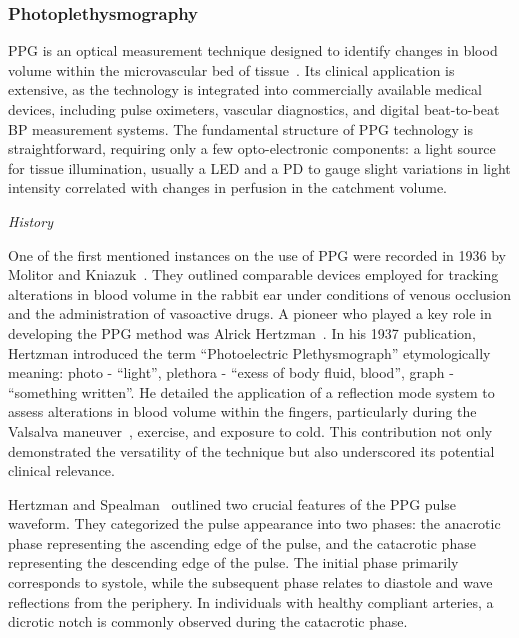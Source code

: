 \subsubsection{Photoplethysmography}
\label{subsubsec:ppg}

PPG is an optical measurement technique designed to identify changes in blood volume within the microvascular bed of tissue~\cite{challonerPhotoelectricPlethysmographMeasurement1974}.
Its clinical application is extensive, as the technology is integrated into commercially available medical devices, including pulse oximeters, vascular diagnostics, and digital beat-to-beat BP measurement systems.
The fundamental structure of PPG technology is straightforward, requiring only a few opto-electronic components: a light source for tissue illumination, usually a \ac{LED} and a \ac{PD} to gauge slight variations in light intensity correlated with changes in perfusion in the catchment volume.

\vspace{0.2cm}
\textit{History}
\vspace{0.2cm}

One of the first mentioned instances on the use of PPG were recorded in 1936 by Molitor and Kniazuk~\cite{molitorNewBloodlessMethod1936}.
They outlined comparable devices employed for tracking alterations in blood volume in the rabbit ear under conditions of venous occlusion and the administration of vasoactive drugs.
A pioneer who played a key role in developing the PPG method was Alrick Hertzman~\cite{hertzmanPhotoelectricPlethysmographyFingers1937}.
In his 1937 publication, Hertzman introduced the term \enquote{Photoelectric Plethysmograph} etymologically meaning:
photo - \enquote{light}, plethora - \enquote{exess of body fluid, blood}, graph - \enquote{something written}.
He detailed the application of a reflection mode system to assess alterations in blood volume within the fingers, particularly during the Valsalva maneuver~\cite{srivastavValsalvaManeuver2024}, exercise, and exposure to cold.
This contribution not only demonstrated the versatility of the technique but also underscored its potential clinical relevance.

Hertzman and Spealman~\cite{hertzmanPhotoelectricPlethysmographyFingers1937} outlined two crucial features of the PPG pulse waveform.
They categorized the pulse appearance into two phases: the anacrotic phase representing the ascending edge of the pulse, and the catacrotic phase representing the descending edge of the pulse.
The initial phase primarily corresponds to systole, while the subsequent phase relates to diastole and wave reflections from the periphery.
In individuals with healthy compliant arteries, a dicrotic notch is commonly observed during the catacrotic phase.


